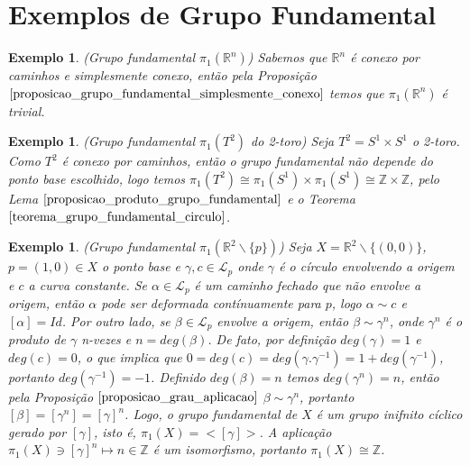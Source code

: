 \documentclass[12pt]{book}
\newtheorem{exemplo}[teorema]{Exemplo}
\newcommand{\caminhos}{\mathcal{L}}
\newcommand{\caminhospontobase}[1]{\caminhos_{#1}}
\newcommand{\circulo}{S^{1}}
\newcommand{\classe}[1]{[#1]}
\newcommand{\grupofundamental}[1]{\pi_{1}(#1)}
\newcommand{\inteiros}{\mathbb{Z}}
\newcommand{\real}[1]{\mathbb{R}^{#1}}
\begin{document}
	\section{Exemplos de Grupo Fundamental}
	\begin{exemplo}
		(Grupo fundamental $\grupofundamental{\real{n}}$) Sabemos que $\real{n}$ é conexo por caminhos e simplesmente conexo, então pela Proposição $\ref{proposicao_grupo_fundamental_simplesmente_conexo}$ temos que $\grupofundamental{\real{n}}$ é trivial.
	\end{exemplo}
	\begin{exemplo}
		(Grupo fundamental $\grupofundamental{T^{2}}$ do 2-toro) Seja $T^{2}=\circulo \times \circulo$ o 2-toro. Como $T^{2}$ é conexo por caminhos, então o grupo fundamental não depende do ponto base escolhido, logo temos $\grupofundamental{T^{2}} \cong \grupofundamental{\circulo} \times \grupofundamental{\circulo} \cong \inteiros \times \inteiros$, pelo Lema $\ref{proposicao_produto_grupo_fundamental}$ e o Teorema $\ref{teorema_grupo_fundamental_circulo}$. 
	\end{exemplo}
	
	\begin{exemplo}\label{exemplo_grupo_fundamental_plano_furo}
		(Grupo fundamental $\grupofundamental{\real{2}\backslash\{p\}}$) Seja $X = \real{2}\backslash \{(0,0)\}$, $p=(1,0) \in X$ o ponto base e $\gamma,c \in \caminhospontobase{p}$ onde $\gamma$ é o círculo envolvendo a origem e $c$ a curva constante. Se $\alpha \in \caminhospontobase{p}$ é um caminho fechado que não envolve a origem, então $\alpha$ pode ser deformada contínuamente para $p$, logo $\alpha \sim c$ e $\classe{\alpha} = Id$. Por outro lado, se $\beta \in \caminhospontobase{p}$ envolve a origem, então $\beta \sim \gamma^{n}$, onde $\gamma^{n}$ é o produto de $\gamma$ n-vezes e $n= deg(\beta)$. De fato, por definição $deg(\gamma) = 1$ e $deg(c) =0$, o que implica que $0= deg(c)=deg(\gamma.\gamma^{-1}) = 1 +deg(\gamma^{-1})$, portanto $deg(\gamma^{-1})=-1$. Definido $deg(\beta)=n$  temos $deg(\gamma^{n}) = n$, então pela Proposição $\ref{proposicao_grau_aplicacao}$ $\beta \sim \gamma^{n}$, portanto $\classe{\beta} =  \classe{\gamma^{n}}=\classe{\gamma}^{n}$. Logo, o grupo fundamental de $X$ é um grupo inifnito cíclico gerado por $\classe{\gamma}$, isto é, $\grupofundamental{X} = <\classe{\gamma}>$. A aplicação $\grupofundamental{X} \ni \classe{\gamma}^{n} \mapsto n \in \inteiros$ é um isomorfismo, portanto $\grupofundamental{X} \cong \inteiros$.
	\end{exemplo}
	
\end{document}
